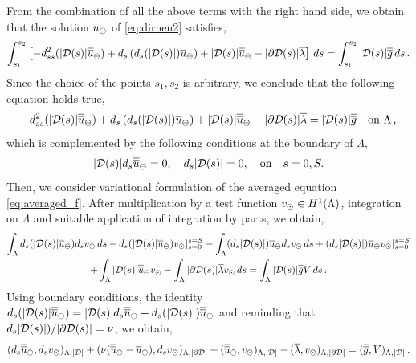 \documentclass[r]{siamart171218}
\begin{document}
From the combination of all the above terms with the right hand side, we obtain that the solution $u_{\ominus}$ of \eqref{eq:dirneu2} satisfies,
\begin{equation*}
\int_{s_1}^{s_2} \left[ 
-d_{ss}^2 (|\mathcal{D}(s)|\overline{\overline{u}}_{\ominus}) +  d_s\left(d_s(|\mathcal{D}(s)|) \overline{u}_{\ominus}\right) + |\mathcal{D}(s)|\overline{\overline{u}}_{\ominus} 
- |\partial\mathcal{D}(s)| \overline{\lambda} 
\right] \, ds = \int_{s_1}^{s_2} |\mathcal{D}(s)| \overline{\overline{g}}\, ds \,.
\end{equation*}
Since the choice of the points $s_1,s_2$ is arbitrary, we conclude that the following equation holds true,
\begin{equation}\label{eq:averaged_f}
-d_{ss}^2 (|\D(s)|\avrd{u}_{\ominus}) +  d_s\left(d_s(|\D(s)|) \avrc{u}_{\ominus}\right) + |\D(s)|\avrd{u}_{\ominus} 
- |\partial\mathcal{D}(s)| \avrc{\lambda}
= |\mathcal{D}(s)| \avrd{g} \quad \text{on} \ \Lambda\,,
\end{equation}
which is complemented by the following conditions at the boundary of $\Lambda$,
\begin{equation}\label{eq:averaged_f_boundary}
|\D(s)| d_s \avrd{u}_{\ominus} = 0, \quad d_s |\D(s)| = 0, \quad \text{on} \quad s=0,S.
\end{equation}
Then, we consider variational formulation of the averaged equation \eqref{eq:averaged_f}.
After multiplication by a test function $v_{\odot} \in H^1(\Lambda)$, integration on $\Lambda$ and suitable application of integration by parts, we obtain,
\begin{multline*}
\int_\Lambda d_s (|\mathcal{D}(s)| \overline{\overline{u}}_{\ominus} ) d_s v_{\odot} \, ds - d_s (|\mathcal{D}(s)| \overline{\overline{u}}_{\ominus} ) v_{\odot} |_{s=0}^{s=S}
- \int_\Lambda (d_s |\mathcal{D}(s)|)\overline{u}_{\ominus} d_s v_{\odot} \, ds + (d_s |\mathcal{D}(s)|) \overline{u}_{\ominus} v_{\odot} |_{s=0}^{s=S}
\\
+\int_\Lambda |\mathcal{D}(s)| \overline{\overline{u}}_\ominus v_{\odot} - \int_\Lambda |\partial\mathcal{D}(s)| \overline{\lambda} v_{\odot} \, ds
= \int_\Lambda |\mathcal{D}(s)| \overline{\overline{g}} V\, ds\,.
\end{multline*}
Using boundary conditions, 
the identity $d_s (|\mathcal{D}(s)| \overline{\overline{u}}_{\ominus} ) = |\mathcal{D}(s)| d_s \overline{\overline{u}}_{\ominus} + d_s (|\mathcal{D}(s)|) \overline{\overline{u}}_{\ominus}$
and reminding that $d_s |\mathcal{D}(s)|)/|\partial\mathcal{D}(s)| = \nu$,
we obtain,
\begin{equation}\label{eq:averaged_f_weak}
(d_s \avrd{u}_{\ominus}, d_s \vd )_{\Lambda,|\D|} 
+ ( \nu (\avrd{u}_{\ominus} - \avrc{u}_{\ominus}), d_s \vd)_{\Lambda,|\DD|} +(\avrd{u}_\ominus, \vd)_{\Lambda, |\D|}
- (\avrc{\lambda},\vd)_{\Lambda,|\DD|}
= (\avrd{g},V)_{\Lambda,|\D|}\,.
\end{equation}
\end{document}
